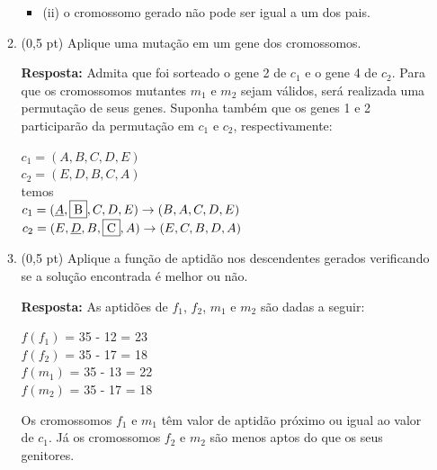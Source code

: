 \documentclass[12pt,a4paper,oneside]{article}
\begin{document}
\begin{enumerate}
\begin{enumerate}
{\begin{itemize}
			\item[] (ii) o cromossomo gerado não pode ser igual a um dos pais.
		\end{itemize}}
		\item (0,5 pt) Aplique uma mutação em um gene dos cromossomos.\\
		{\color{blue} {\bf Resposta:} Admita que foi sorteado o gene 2 de $c_1$ e o gene 4 de $c_2$. Para que os cromossomos mutantes $m_1$ e $m_2$ sejam válidos, será realizada uma permutação de seus genes. Suponha também que os genes 1 e 2 participarão da permutação em $c_1$ e $c_2$, respectivamente:
			\begin{center}
				$c_1 = (A,B,C,D,E)$\\
				$c_2 = (E,D,B,C,A)$\\
				temos\\
				$c_1 = (\underline{A},\fbox{B},C,D,E) \rightarrow (B,A,C,D,E)$\\
				$c_2 = (E,\underline{D},B,\fbox{C},A) \rightarrow (E,C,B,D,A)$
			\end{center}}
		\item (0,5 pt) Aplique a função de aptidão nos descendentes gerados verificando se a solução encontrada é melhor ou não.\\
		{\color{blue} {\bf Resposta:} As aptidões de $f_1$, $f_2$, $m_1$ e $m_2$ são dadas a seguir:
			\begin{center}
				$f(f_1)$ 	= 35 - 12 = 23\\
				$f(f_2)$ 	= 35 - 17 = 18\\
				$f(m_1)$ 	= 35 - 13 = 22\\
				$f(m_2)$ 	= 35 - 17 = 18
		\end{center}
		Os cromossomos $f_1$ e $m_1$ têm valor de aptidão próximo ou igual ao valor de $c_1$. Já os cromossomos $f_2$ e $m_2$ são menos aptos do que os seus genitores.}
		
	\end{enumerate}
	
	\end{enumerate}
\end{document}
